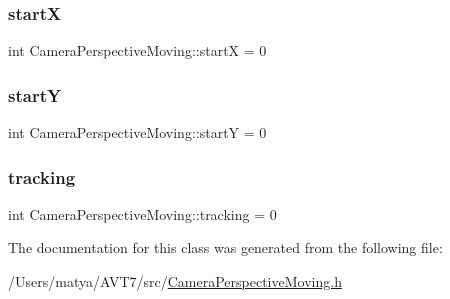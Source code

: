 \subsubsection{\texorpdfstring{startX}{startX}}
{\footnotesize\ttfamily int Camera\+Perspective\+Moving\+::startX = 0}

\mbox{\label{class_camera_perspective_moving_a8a18360e9a24f78c32fd5e7d667a24e4}} 
\subsubsection{\texorpdfstring{startY}{startY}}
{\footnotesize\ttfamily int Camera\+Perspective\+Moving\+::startY = 0}

\mbox{\label{class_camera_perspective_moving_acf09c3044b76990c814adc466471a571}} 
\subsubsection{\texorpdfstring{tracking}{tracking}}
{\footnotesize\ttfamily int Camera\+Perspective\+Moving\+::tracking = 0}



The documentation for this class was generated from the following file\+:\begin{DoxyCompactItemize}
\item 
/\+Users/matya/\+A\+V\+T7/src/\hyperlink{_camera_perspective_moving_8h}{Camera\+Perspective\+Moving.\+h}\end{DoxyCompactItemize}
